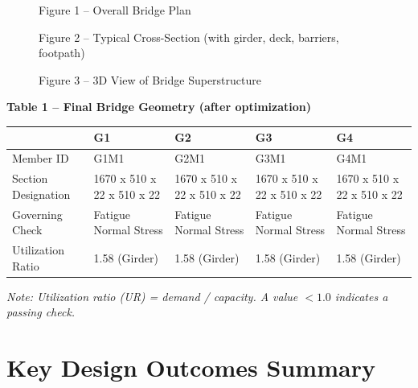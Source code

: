\documentclass[12pt,a4paper]{report}
\numberwithin{table}{chapter}
\numberwithin{figure}{chapter}
\begin{document}
\begin{figure}[H]
\centering
{}
\caption*{Figure 1 -- Overall Bridge Plan}
\end{figure}

\newpage

\begin{figure}[H]
\centering
{}
\caption*{Figure 2 -- Typical Cross-Section (with girder, deck, barriers, footpath)}
\end{figure}

\begin{figure}[H]
\centering
{}
\caption*{Figure 3 -- 3D View of Bridge Superstructure}
\end{figure}

\noindent\textbf{Table 1 -- Final Bridge Geometry (after optimization)}

\vspace{0.4em}
\noindent
\begin{tabular}{|C{2.8cm}|C{3.0cm}|C{3.0cm}|C{3.0cm}|C{3.0cm}|}
\hline
  \textbf{} &
  \textbf{G1} &
  \textbf{G2} &
  \textbf{G3} &
  \textbf{G4} \\
\hline
Member ID & G1M1 & G2M1 & G3M1 & G4M1 \\
\hline
Section Designation & 1670 x 510 x 22 x 510 x 22 & 1670 x 510 x 22 x 510 x 22 & 1670 x 510 x 22 x 510 x 22 & 1670 x 510 x 22 x 510 x 22 \\
\hline
Governing Check & Fatigue Normal Stress & Fatigue Normal Stress & Fatigue Normal Stress & Fatigue Normal Stress \\
\hline
Utilization Ratio & 1.58 (Girder) & 1.58 (Girder) & 1.58 (Girder) & 1.58 (Girder) \\
\hline
\end{tabular}

\vspace{0.4em}
\noindent\textit{Note: Utilization ratio (UR) = demand / capacity. A value $< 1.0$ indicates a passing check.}

\vspace{1em}

\section*{Key Design Outcomes Summary}
\label{sec:key-outcomes}
\end{document}

